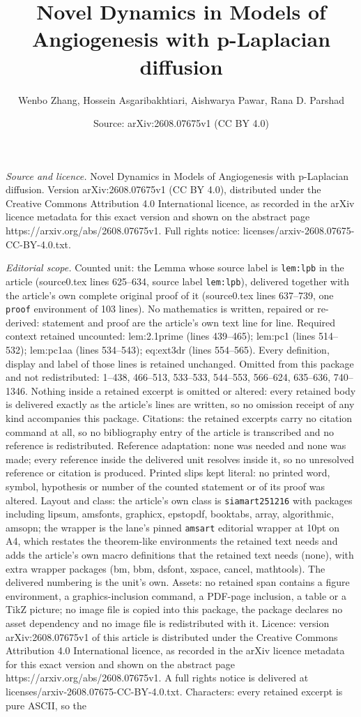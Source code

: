 \documentclass[10pt,a4paper]{amsart}
\title[Novel Dynamics in Models of Angiogenesis with p-Laplacian di]{Novel Dynamics in Models of Angiogenesis with p-Laplacian diffusion}
\author{Wenbo Zhang, Hossein Asgaribakhtiari, Aishwarya Pawar, Rana D. Parshad}
\date{Source: arXiv:2608.07675v1 (CC BY 4.0)}
\begin{document}
\maketitle

\noindent\emph{Source and licence.} Novel Dynamics in Models of Angiogenesis with p-Laplacian diffusion. Version arXiv:2608.07675v1 (CC BY 4.0), distributed under the Creative Commons Attribution 4.0 International licence, as recorded in the arXiv licence metadata for this exact version and shown on the abstract page https://arxiv.org/abs/2608.07675v1. Full rights notice: licenses/arxiv-2608.07675-CC-BY-4.0.txt.\par\smallskip

\noindent\textit{Editorial scope.} Counted unit: the Lemma whose source label is \texttt{lem:lpb} in the article (source0.tex lines 625--634, source label \texttt{lem:lpb}), delivered together with the article's own complete original proof of it (source0.tex lines 637--739, one \texttt{proof} environment of 103 lines). No mathematics is written, repaired or re-derived: statement and proof are the article's own text line for line. Required context retained uncounted: lem:2.1prime (lines 439--465); lem:pc1 (lines 514--532); lem:pc1aa (lines 534--543); eq:ext3dr (lines 554--565). Every definition, display and label of those lines is retained unchanged. Omitted from this package and not redistributed: 1--438, 466--513, 533--533, 544--553, 566--624, 635--636, 740--1346. Nothing inside a retained excerpt is omitted or altered: every retained body is delivered exactly as the article's lines are written, so no omission receipt of any kind accompanies this package. Citations: the retained excerpts carry no citation command at all, so no bibliography entry of the article is transcribed and no reference is redistributed. Reference adaptation: none was needed and none was made; every reference inside the delivered unit resolves inside it, so no unresolved reference or citation is produced. Printed slips kept literal: no printed word, symbol, hypothesis or number of the counted statement or of its proof was altered. Layout and class: the article's own class is \texttt{siamart251216} with packages including lipsum, amsfonts, graphicx, epstopdf, booktabs, array, algorithmic, amsopn; the wrapper is the lane's pinned \texttt{amsart} editorial wrapper at 10pt on A4, which restates the theorem-like environments the retained text needs and adds the article's own macro definitions that the retained text needs (none), with extra wrapper packages (bm, bbm, dsfont, xspace, cancel, mathtools). The delivered numbering is the unit's own. Assets: no retained span contains a figure environment, a graphics-inclusion command, a PDF-page inclusion, a table or a TikZ picture; no image file is copied into this package, the package declares no asset dependency and no image file is redistributed with it. Licence: version arXiv:2608.07675v1 of this article is distributed under the Creative Commons Attribution 4.0 International licence, as recorded in the arXiv licence metadata for this exact version and shown on the abstract page https://arxiv.org/abs/2608.07675v1. A full rights notice is delivered at licenses/arxiv-2608.07675-CC-BY-4.0.txt. Characters: every retained excerpt is pure ASCII, so the 
\end{document}

